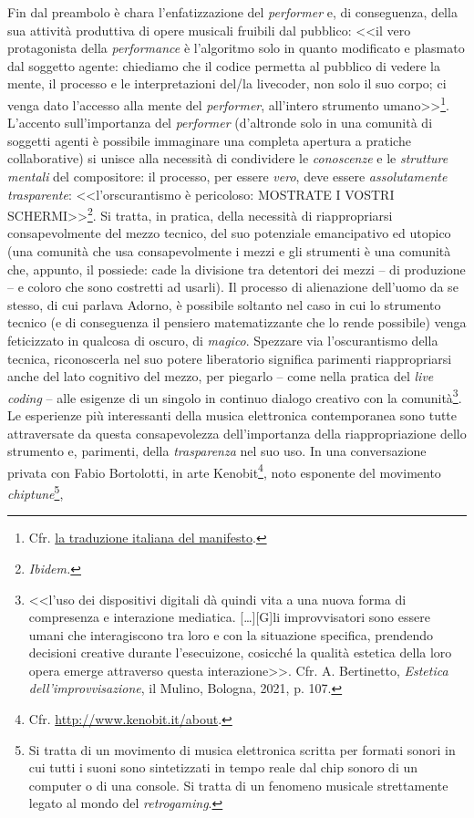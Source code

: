 \documentclass[a4paper,12pt]{scrartcl}
\newcommand{\omissis}{[\dots\unkern]}
\begin{document}
	Fin dal preambolo è chara l'enfatizzazione del \emph{performer} e, di conseguenza, della sua attività produttiva di opere musicali fruibili dal pubblico: <<il vero protagonista della \emph{performance} è l'algoritmo solo in quanto modificato e plasmato dal soggetto agente: chiediamo che il codice permetta al pubblico di vedere la mente, il processo e le interpretazioni del/la livecoder, non solo il suo corpo; ci venga dato l'accesso alla mente del \emph{performer}, all'intero strumento umano>>\footnote{Cfr. \href{https://toplapitalia.gitlab.io/manifesto.html}{la traduzione italiana del manifesto}.}. L'accento sull'importanza del \emph{performer} (d'altronde solo in una comunità di soggetti agenti è possibile immaginare una completa apertura a pratiche collaborative) si unisce alla necessità di condividere le \emph{conoscenze} e le \emph{strutture mentali} del compositore: il processo, per essere \emph{vero}, deve essere \emph{assolutamente trasparente}: <<l'orscurantismo è pericoloso: MOSTRATE I VOSTRI SCHERMI>>\footnote{\textit{Ibidem.}}. Si tratta, in pratica, della necessità di riappropriarsi consapevolmente del mezzo tecnico, del suo potenziale emancipativo ed utopico (una comunità che usa consapevolmente i mezzi e gli strumenti è una comunità che, appunto, il possiede: cade la divisione tra detentori dei mezzi -- di produzione -- e coloro che sono costretti ad usarli). Il processo di alienazione dell'uomo da se stesso, di cui parlava Adorno, è possibile soltanto nel caso in cui lo strumento tecnico (e di conseguenza il pensiero matematizzante che lo rende possibile) venga feticizzato in qualcosa di oscuro, di \emph{magico}. Spezzare via l'oscurantismo della tecnica, riconoscerla nel suo potere liberatorio significa parimenti riappropriarsi anche del lato cognitivo del mezzo, per piegarlo -- come nella pratica del \emph{live coding} -- alle esigenze di un singolo in continuo dialogo creativo con la comunità\footnote{<<l'uso dei dispositivi digitali dà quindi vita a una nuova forma di compresenza e interazione mediatica. \omissis [G]li improvvisatori sono essere umani che interagiscono tra loro e con la situazione specifica, prendendo decisioni creative durante l'esecuizone, cosicché la qualità estetica della loro opera emerge attraverso questa interazione>>. Cfr. A. Bertinetto, \textit{Estetica dell'improvvisazione}, il Mulino, Bologna, 2021, p. 107.}. Le esperienze più interessanti della musica elettronica contemporanea sono tutte attraversate da questa consapevolezza dell'importanza della riappropriazione dello strumento e, parimenti, della \emph{trasparenza} nel suo uso. In una conversazione privata con Fabio Bortolotti, in arte Kenobit\footnote{Cfr. \url{http://www.kenobit.it/about}.}, noto esponente del movimento \emph{chiptune}\footnote{Si tratta di un movimento di musica elettronica scritta per formati sonori in cui tutti i suoni sono sintetizzati in tempo reale dal chip sonoro di un computer o di una console. Si tratta di un fenomeno musicale strettamente legato al mondo del \emph{retrogaming}.}, 
\end{document}
